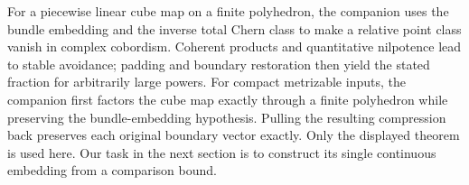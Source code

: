For a piecewise linear cube map on a finite polyhedron, the companion
uses the bundle embedding and the inverse total Chern class to make a
relative point class vanish in complex cobordism. Coherent products and
quantitative nilpotence lead to stable avoidance; padding and boundary
restoration then yield the stated
fraction for arbitrarily large powers. For compact metrizable inputs,
the companion first factors the cube map exactly through a finite
polyhedron while preserving the bundle-embedding hypothesis. Pulling
the resulting compression back preserves each original boundary vector
exactly.
Only the displayed theorem is used here. Our task in the next section
is to construct its single continuous embedding from a comparison bound.
